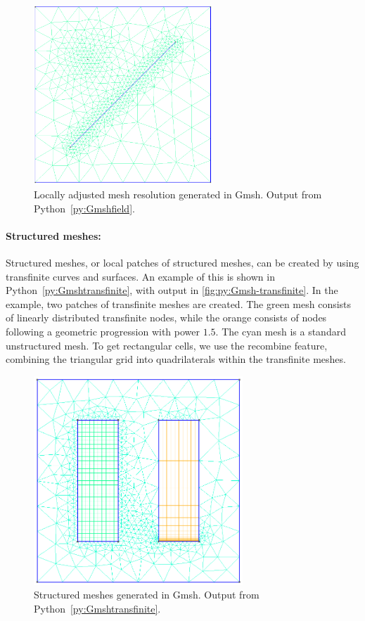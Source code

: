 \begin{figure}[htp]
    \centering
    \includegraphics[width=0.6\textwidth]{report/Images/Software/Gmsh examples/gmsh_mesh_size_fields.png}
    \caption[Adjusted mesh size generated in Gmsh]{Locally adjusted mesh resolution generated in Gmsh. Output from Python~\ref{py:Gmshfield}.}
    \label{fig:py:Gmsh-field}
\end{figure}

\paragraph{Structured meshes:}
Structured meshes, or local patches of structured meshes, can be created by using transfinite curves and surfaces. An example of this is shown in Python~\ref{py:Gmshtransfinite}, with output in \autoref{fig:py:Gmsh-transfinite}. In the example, two patches of transfinite meshes are created. The green mesh consists of linearly distributed transfinite nodes, while the orange consists of nodes following a geometric progression with power $1.5$. The cyan mesh is a standard unstructured mesh. To get rectangular cells, we use the recombine feature, combining the triangular grid into quadrilaterals within the transfinite meshes.

\begin{figure}[htp]
    \centering
    \includegraphics[width=0.7\textwidth]{report/Images/Software/Gmsh examples/gmsh_structured_meshes.png}
    \caption[Structured meshes generated in Gmsh]{Structured meshes generated in Gmsh. Output from Python~\ref{py:Gmshtransfinite}.}
    \label{fig:py:Gmsh-transfinite}
\end{figure}

